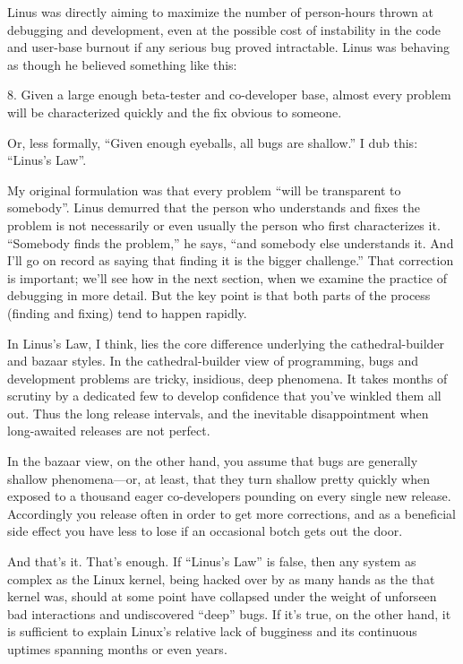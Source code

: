 \documentclass[a4paper,12pt,UTF8,twoside]{ctexbook}
\begin{document}
Linus was directly aiming to maximize the number of person-hours thrown at debugging and development, even at the possible cost of instability in the code and user-base burnout if any serious bug proved intractable. Linus was behaving as though he believed something like this:

8. Given a large enough beta-tester and co-developer base, almost every problem will be characterized quickly and the fix obvious to someone.

Or, less formally, ``Given enough eyeballs, all bugs are shallow.'' I dub this: ``Linus's Law''.

My original formulation was that every problem ``will be transparent to somebody''. Linus demurred that the person who understands and fixes the problem is not necessarily or even usually the person who first characterizes it. ``Somebody finds the problem,'' he says, ``and somebody else understands it. And I'll go on record as saying that finding it is the bigger challenge.'' That correction is important; we'll see how in the next section, when we examine the practice of debugging in more detail. But the key point is that both parts of the process (finding and fixing) tend to happen rapidly.

In Linus's Law, I think, lies the core difference underlying the cathedral-builder and bazaar styles. In the cathedral-builder view of programming, bugs and development problems are tricky, insidious, deep phenomena. It takes months of scrutiny by a dedicated few to develop confidence that you've winkled them all out. Thus the long release intervals, and the inevitable disappointment when long-awaited releases are not perfect.

In the bazaar view, on the other hand, you assume that bugs are generally shallow phenomena—or, at least, that they turn shallow pretty quickly when exposed to a thousand eager co-developers pounding on every single new release. Accordingly you release often in order to get more corrections, and as a beneficial side effect you have less to lose if an occasional botch gets out the door.

And that's it. That's enough. If ``Linus's Law'' is false, then any system as complex as the Linux kernel, being hacked over by as many hands as the that kernel was, should at some point have collapsed under the weight of unforseen bad interactions and undiscovered ``deep'' bugs. If it's true, on the other hand, it is sufficient to explain Linux's relative lack of bugginess and its continuous uptimes spanning months or even years.
\end{document}
